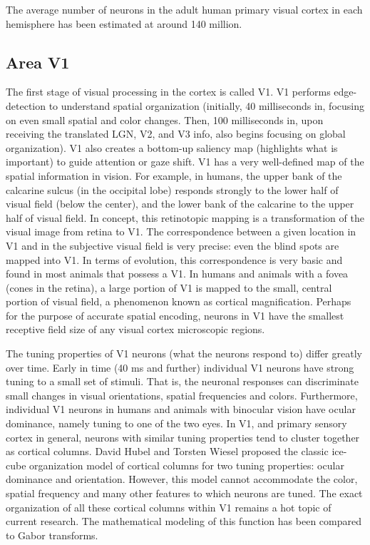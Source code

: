 The average number of neurons in the adult human primary visual cortex in each hemisphere has been estimated at around 140 million.

\hypertarget{area-v1}{%
\subsection{Area V1}\label{area-v1}}

The first stage of visual processing in the cortex is called V1. V1 performs edge-detection to understand spatial organization (initially, 40 milliseconds in, focusing on even small spatial and color changes. Then, 100 milliseconds in, upon receiving the translated LGN, V2, and V3 info, also begins focusing on global organization). V1 also creates a bottom-up saliency map (highlights what is important) to guide attention or gaze shift. V1 has a very well-defined map of the spatial information in vision. For example, in humans, the upper bank of the calcarine sulcus (in the occipital lobe) responds strongly to the lower half of visual field (below the center), and the lower bank of the calcarine to the upper half of visual field. In concept, this retinotopic mapping is a transformation of the visual image from retina to V1. The correspondence between a given location in V1 and in the subjective visual field is very precise: even the blind spots are mapped into V1. In terms of evolution, this correspondence is very basic and found in most animals that possess a V1. In humans and animals with a fovea (cones in the retina), a large portion of V1 is mapped to the small, central portion of visual field, a phenomenon known as cortical magnification. Perhaps for the purpose of accurate spatial encoding, neurons in V1 have the smallest receptive field size of any visual cortex microscopic regions.

The tuning properties of V1 neurons (what the neurons respond to) differ greatly over time. Early in time (40 ms and further) individual V1 neurons have strong tuning to a small set of stimuli. That is, the neuronal responses can discriminate small changes in visual orientations, spatial frequencies and colors. Furthermore, individual V1 neurons in humans and animals with binocular vision have ocular dominance, namely tuning to one of the two eyes. In V1, and primary sensory cortex in general, neurons with similar tuning properties tend to cluster together as cortical columns. David Hubel and Torsten Wiesel proposed the classic ice-cube organization model of cortical columns for two tuning properties: ocular dominance and orientation. However, this model cannot accommodate the color, spatial frequency and many other features to which neurons are tuned. The exact organization of all these cortical columns within V1 remains a hot topic of current research. The mathematical modeling of this function has been compared to Gabor transforms.


